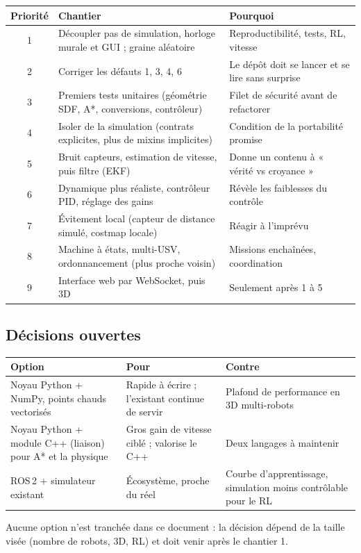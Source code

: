\documentclass[11pt,a4paper]{article}
\newcommand{\code}[1]{\texttt{\detokenize{#1}}}
\begin{document}
\begin{center}
\begin{tabularx}{\textwidth}{c >{\raggedright\arraybackslash}p{4.4cm} X}
\toprule
\textbf{Priorité} & \textbf{Chantier} & \textbf{Pourquoi}\\
\midrule
1 & Découpler pas de simulation, horloge murale et GUI ; graine aléatoire & Reproductibilité, tests, RL, vitesse\\
2 & Corriger les défauts 1, 3, 4, 6 & Le dépôt doit se lancer et se lire sans surprise\\
3 & Premiers tests unitaires (géométrie SDF, A*, conversions, contrôleur) & Filet de sécurité avant de refactorer\\
4 & Isoler \code{autonomy} de la simulation (contrats explicites, plus de mixins implicites) & Condition de la portabilité promise\\
5 & Bruit capteurs, estimation de vitesse, puis filtre (EKF) & Donne un contenu à « vérité vs croyance »\\
6 & Dynamique plus réaliste, contrôleur PID, réglage des gains & Révèle les faiblesses du contrôle\\
7 & Évitement local (capteur de distance simulé, costmap locale) & Réagir à l'imprévu\\
8 & Machine à états, multi-USV, ordonnancement (plus proche voisin) & Missions enchaînées, coordination\\
9 & Interface web par WebSocket, puis 3D & Seulement après 1 à 5\\
\bottomrule
\end{tabularx}
\end{center}

\subsection*{Décisions ouvertes}
\begin{center}
\begin{tabularx}{\textwidth}{>{\raggedright\arraybackslash}p{3.1cm}XX}
\toprule
\textbf{Option} & \textbf{Pour} & \textbf{Contre}\\
\midrule
Noyau Python + NumPy, points chauds vectorisés & Rapide à écrire ; l'existant continue de servir & Plafond de performance en 3D multi-robots\\
Noyau Python + module C++ (liaison) pour A* et la physique & Gros gain de vitesse ciblé ; valorise le C++ & Deux langages à maintenir\\
ROS\,2 + simulateur existant & Écosystème, proche du réel & Courbe d'apprentissage, simulation moins contrôlable pour le RL\\
\bottomrule
\end{tabularx}
\end{center}
Aucune option n'est tranchée dans ce document : la décision dépend de la taille visée (nombre de robots, 3D, RL) et doit venir après le chantier 1.
\end{document}
